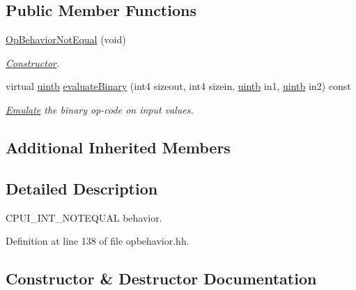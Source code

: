 \subsection*{Public Member Functions}
\begin{DoxyCompactItemize}
\item 
\mbox{\hyperlink{class_op_behavior_not_equal_a4356e9707147c85c956540e4ff418399}{Op\+Behavior\+Not\+Equal}} (void)
\begin{DoxyCompactList}\small\item\em \mbox{\hyperlink{class_constructor}{Constructor}}. \end{DoxyCompactList}\item 
virtual \mbox{\hyperlink{types_8h_a2db313c5d32a12b01d26ac9b3bca178f}{uintb}} \mbox{\hyperlink{class_op_behavior_not_equal_a8d79390685e0675b04685dea66155e55}{evaluate\+Binary}} (int4 sizeout, int4 sizein, \mbox{\hyperlink{types_8h_a2db313c5d32a12b01d26ac9b3bca178f}{uintb}} in1, \mbox{\hyperlink{types_8h_a2db313c5d32a12b01d26ac9b3bca178f}{uintb}} in2) const
\begin{DoxyCompactList}\small\item\em \mbox{\hyperlink{class_emulate}{Emulate}} the binary op-\/code on input values. \end{DoxyCompactList}\end{DoxyCompactItemize}
\subsection*{Additional Inherited Members}


\subsection{Detailed Description}
C\+P\+U\+I\+\_\+\+I\+N\+T\+\_\+\+N\+O\+T\+E\+Q\+U\+AL behavior. 

Definition at line 138 of file opbehavior.\+hh.



\subsection{Constructor \& Destructor Documentation}
\mbox{\label{class_op_behavior_not_equal_a4356e9707147c85c956540e4ff418399}} 
